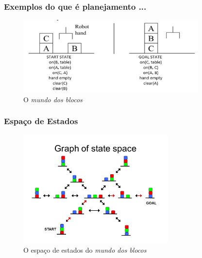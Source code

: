 \begin{frame}[fragile]
\frametitle{Exemplos do que é planejamento ...}

\begin{figure}[!htb]
\centering
\includegraphics[width=0.850\textwidth, height=0.650\textheight]{figures/mundo_dos_blocos01.jpg}
\caption{O \textit{mundo dos blocos}}
\end{figure}


\end{frame}


\begin{frame}[fragile]
\frametitle{Espaço de Estados}

\begin{figure}[!htb]
\centering
\includegraphics[width=0.7\textwidth, height=0.70\textheight]{figures/mundo_dos_blocos02.jpg}
\caption{O espaço de estados do \textit{mundo dos blocos}}
\end{figure}


\end{frame}



